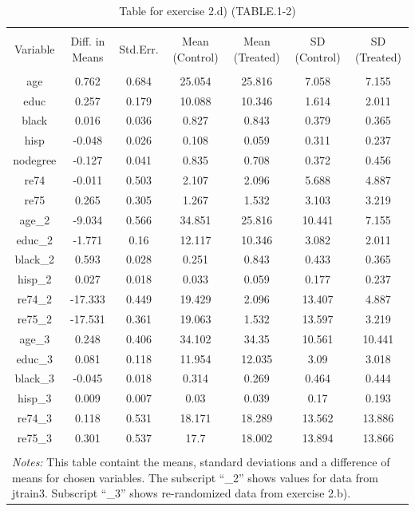 
\begin{table}[!htbp] \centering 
  \caption{Table for exercise 2.d) (TABLE.1-2)} 
  \label{} 
\begin{tabular}{@{\extracolsep{5pt}} ccccccc} 
\\[-1.8ex]\hline 
\hline \\[-1.8ex] 
Variable & Diff. in Means & Std.Err. & Mean (Control) & Mean (Treated) & SD (Control) & SD (Treated) \\ 
\hline \\[-1.8ex] 
age & 0.762 & 0.684 & 25.054 & 25.816 & 7.058 & 7.155 \\ 
educ & 0.257 & 0.179 & 10.088 & 10.346 & 1.614 & 2.011 \\ 
black & 0.016 & 0.036 & 0.827 & 0.843 & 0.379 & 0.365 \\ 
hisp & -0.048 & 0.026 & 0.108 & 0.059 & 0.311 & 0.237 \\ 
nodegree & -0.127 & 0.041 & 0.835 & 0.708 & 0.372 & 0.456 \\ 
re74 & -0.011 & 0.503 & 2.107 & 2.096 & 5.688 & 4.887 \\ 
re75 & 0.265 & 0.305 & 1.267 & 1.532 & 3.103 & 3.219 \\ 
age\_2 & -9.034 & 0.566 & 34.851 & 25.816 & 10.441 & 7.155 \\ 
educ\_2 & -1.771 & 0.16 & 12.117 & 10.346 & 3.082 & 2.011 \\ 
black\_2 & 0.593 & 0.028 & 0.251 & 0.843 & 0.433 & 0.365 \\ 
hisp\_2 & 0.027 & 0.018 & 0.033 & 0.059 & 0.177 & 0.237 \\ 
re74\_2 & -17.333 & 0.449 & 19.429 & 2.096 & 13.407 & 4.887 \\ 
re75\_2 & -17.531 & 0.361 & 19.063 & 1.532 & 13.597 & 3.219 \\ 
age\_3 & 0.248 & 0.406 & 34.102 & 34.35 & 10.561 & 10.441 \\ 
educ\_3 & 0.081 & 0.118 & 11.954 & 12.035 & 3.09 & 3.018 \\ 
black\_3 & -0.045 & 0.018 & 0.314 & 0.269 & 0.464 & 0.444 \\ 
hisp\_3 & 0.009 & 0.007 & 0.03 & 0.039 & 0.17 & 0.193 \\ 
re74\_3 & 0.118 & 0.531 & 18.171 & 18.289 & 13.562 & 13.886 \\ 
re75\_3 & 0.301 & 0.537 & 17.7 & 18.002 & 13.894 & 13.866 \\ 
\hline \\[-1.8ex] 
\multicolumn{7}{l}{\parbox{17cm}{\textit{Notes:} This table containt the means, standard deviations and a difference of means for chosen variables. The subscript ``\_2'' shows values for data from jtrain3. Subscript ``\_3'' shows re-randomized data from exercise 2.b).}} \\ 
\end{tabular} 
\end{table} 
